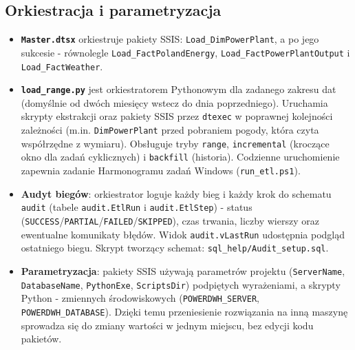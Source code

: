 \documentclass[12pt]{article}
\begin{document}
	\subsection{Orkiestracja i parametryzacja}
	\begin{itemize}
		\item \textbf{\texttt{Master.dtsx}} orkiestruje pakiety SSIS: \texttt{Load\_DimPowerPlant}, a po jego sukcesie - równolegle \texttt{Load\_FactPolandEnergy}, \texttt{Load\_FactPowerPlantOutput} i \texttt{Load\_FactWeather}.
		\item \textbf{\texttt{load\_range.py}} jest orkiestratorem Pythonowym dla zadanego zakresu dat (domyślnie od dwóch miesięcy wstecz do dnia poprzedniego). Uruchamia skrypty ekstrakcji oraz pakiety SSIS przez \texttt{dtexec} w poprawnej kolejności zależności (m.in. \texttt{DimPowerPlant} przed pobraniem pogody, która czyta współrzędne z wymiaru). Obsługuje tryby \texttt{range}, \texttt{incremental} (kroczące okno dla zadań cyklicznych) i \texttt{backfill} (historia). Codzienne uruchomienie zapewnia zadanie Harmonogramu zadań Windows (\texttt{run\_etl.ps1}).
		\item \textbf{Audyt biegów}: orkiestrator loguje każdy bieg i każdy krok do schematu \texttt{audit} (tabele \texttt{audit.EtlRun} i \texttt{audit.EtlStep}) - status (\texttt{SUCCESS}/\texttt{PARTIAL}/\texttt{FAILED}/\texttt{SKIPPED}), czas trwania, liczby wierszy oraz ewentualne komunikaty błędów. Widok \texttt{audit.vLastRun} udostępnia podgląd ostatniego biegu. Skrypt tworzący schemat: \texttt{sql\_help/Audit\_setup.sql}.
		\item \textbf{Parametryzacja}: pakiety SSIS używają parametrów projektu (\texttt{ServerName}, \texttt{DatabaseName}, \texttt{PythonExe}, \texttt{ScriptsDir}) podpiętych wyrażeniami, a skrypty Python - zmiennych środowiskowych (\texttt{POWERDWH\_SERVER}, \texttt{POWERDWH\_DATABASE}). Dzięki temu przeniesienie rozwiązania na inną maszynę sprowadza się do zmiany wartości w jednym miejscu, bez edycji kodu pakietów.
	\end{itemize}
\end{document}
